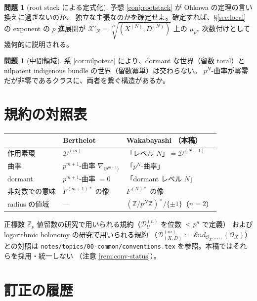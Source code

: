\documentclass[a4paper,11pt]{ltjsarticle}
\theoremstyle{plain}
\theoremstyle{definition}
\newtheorem{question}[theorem]{問題}
\newcommand{\bbZ}{\mathbb{Z}}
\newcommand{\cD}{\mathcal{D}}
\newcommand{\cO}{\mathcal{O}}
\begin{document}
\begin{question}[root stack による定式化]\label{q:rootstack}
予想 \ref{conj:rootstack} が Ohkawa \cite{Ohk} の定理の言い換えに過ぎないのか、
独立な主張なのかを確定せよ。確定すれば、\S\ref{sec:local} の exponent の
$p$ 進展開が $\mathcal{X}'_N=\sqrt[p^N]{(X^{(N)},D^{(N)})}$ 上の
$\mu_{p^N}$ 次数付けとして幾何的に説明される。
\end{question}

\begin{question}[中間領域]\label{q:middle}
系 \ref{cor:nilpotent} により、dormant な世界（留数 toral）と
nilpotent indigenous bundle の世界（留数冪単）は交わらない。
$p^N$-曲率が冪零だが非零であるクラスに、両者を繋ぐ構造があるか。
\end{question}

\appendix
\section{規約の対照表}

\begin{table}[htbp]
\centering
\begin{tabular}{lll}
\toprule
& Berthelot & Wakabayashi \cite{Wak}（本稿）\\
\midrule
作用素環 & $\cD^{(m)}$ & 「レベル $N$」$=\cD^{(N-1)}$\\
曲率 & $p^{m+1}$-曲率 $\nabla_{\langle p^{m+1}\rangle}$ & 「$p^N$-曲率」\\
dormant & $p^{m+1}$-曲率 $=0$ & 「dormant レベル $N$」\\
非対数での意味 & $F^{(m+1)*}$ の像 & $F^{(N)*}$ の像\\
radius の値域 & --- & $(\bbZ/p^N\bbZ)^\times/\{\pm1\}$（$n=2$）\\
\bottomrule
\end{tabular}
\end{table}

正標数 $\bbZ_p$ 値留数の研究で用いられる規約（$\cD_U^{(n)}$ を位数 $<p^n$ で定義）
および logarithmic holonomy の研究で用いられる規約
（$\cD^{(m)}_{(X,D)}:=\mathcal{E}nd_{\cO_{X^{(m+1)}}}(\cO_X)$）との対照は
\texttt{notes/topics/00-common/conventions.tex} を参照。本稿ではそれらを採用・統一しない
（注意 \ref{rem:conv-status}）。

\section{訂正の履歴}\label{app:errata}
\end{document}

